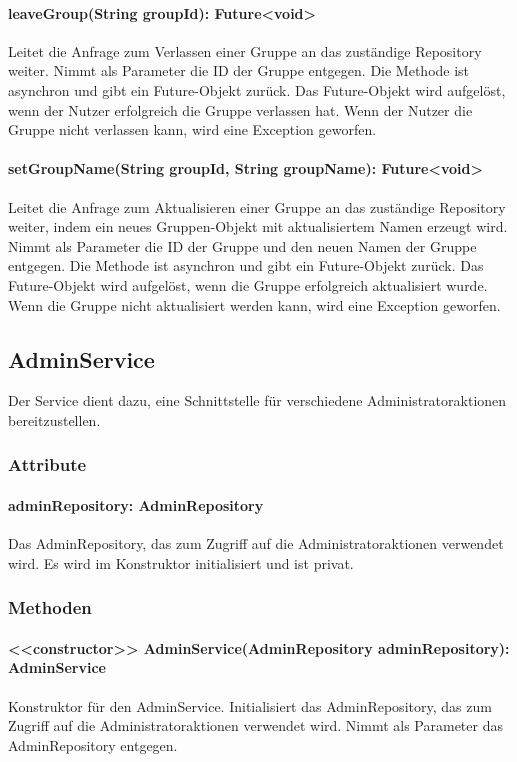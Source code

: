\documentclass[parskip=full]{scrartcl}
\begin{document}
\paragraph{leaveGroup(String groupId): Future<void>}
Leitet die Anfrage zum Verlassen einer Gruppe an das zuständige Repository weiter. Nimmt als Parameter die ID der Gruppe entgegen. Die Methode ist asynchron und gibt ein Future-Objekt zurück. Das Future-Objekt wird aufgelöst, wenn der Nutzer erfolgreich die Gruppe verlassen hat. Wenn der Nutzer die Gruppe nicht verlassen kann, wird eine Exception geworfen.
\paragraph{setGroupName(String groupId, String groupName): Future<void>}
Leitet die Anfrage zum Aktualisieren einer Gruppe an das zuständige Repository weiter, indem ein neues Gruppen-Objekt mit aktualisiertem Namen erzeugt wird. Nimmt als Parameter die ID der Gruppe und den neuen Namen der Gruppe entgegen. Die Methode ist asynchron und gibt ein Future-Objekt zurück. Das Future-Objekt wird aufgelöst, wenn die Gruppe erfolgreich aktualisiert wurde. Wenn die Gruppe nicht aktualisiert werden kann, wird eine Exception geworfen.

\newpage
\subsection{AdminService}
Der Service dient dazu, eine Schnittstelle für verschiedene Administratoraktionen bereitzustellen.
\subsubsection*{Attribute}
\paragraph{adminRepository: AdminRepository}
Das AdminRepository, das zum Zugriff auf die Administratoraktionen verwendet wird. Es wird im Konstruktor initialisiert und ist privat.
\subsubsection*{Methoden}
\paragraph{<<constructor>> AdminService(AdminRepository adminRepository): AdminService}
Konstruktor für den AdminService. Initialisiert das AdminRepository, das zum Zugriff auf die Administratoraktionen verwendet wird. Nimmt als Parameter das AdminRepository entgegen.
\end{document}
